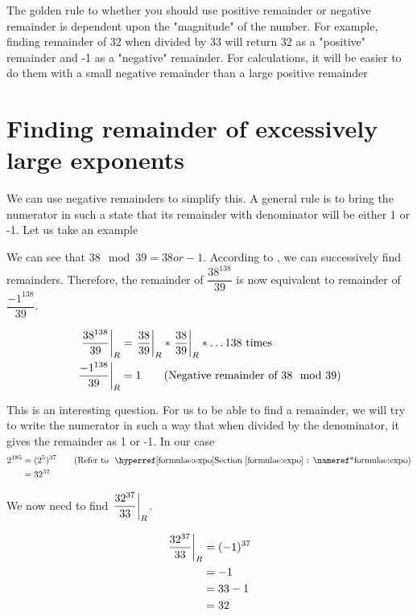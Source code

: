 \begin{EXTRA-LEARNING}
    The golden rule to whether you should use positive remainder or negative remainder is dependent upon the "magnitude" of the number. For example, finding remainder of 32 when divided by 33 will return 32 as a "positive" remainder and -1 as a "negative" remainder. For calculations, it will be easier to do them with a small negative remainder than a large positive remainder
\end{EXTRA-LEARNING}

\section{Finding remainder of excessively large exponents}

We can use negative remainders to simplify this. A general rule is to bring the numerator in such a state that its remainder with denominator will be either 1 or -1. Let us take an example


We can see that $38 \mod 39 = 38 or -1$. According to , we can successively find remainders. Therefore, the remainder of $\dfrac{38^{138}}{39}$ is now equivalent to remainder of $\dfrac{-1^{138}}{39}$. 

\begin{align*}
    \displaystyle{ \left. \frac{38^{138}}{39} \right |_{R} } &= \displaystyle{ \left. \frac{38}{39} \right |_{R} } * \displaystyle{ \left. \frac{38}{39} \right |_{R} } * \ldots \text{138 times} \\
    \displaystyle{ \left. \frac{-1^{138}}{39} \right |_{R} } &= 1 \tag{Negative remainder of $38 \mod 39$} \\
\end{align*}

\vspace{2cm}


This is an interesting question. For us to be able to find a remainder, we will try to write the numerator in such a way that when divided by the denominator, it gives the remainder as 1 or -1. In our case
\begin{align*}
    2^{185} &= (2^{5})^{37} \tag{Refer to \fullref{formulae:expo}} \\
    &= 32^{37}
\end{align*}

We now need to find $\displaystyle{ \left. \frac{32^{37}}{33} \right |_{R} }$.

\begin{align*}
    \displaystyle{ \left. \frac{32^{37}}{33} \right |_{R} } &= (-1)^{37} \\
    &= -1 \\
    &= 33 - 1 \\
    &= 32
\end{align*}

